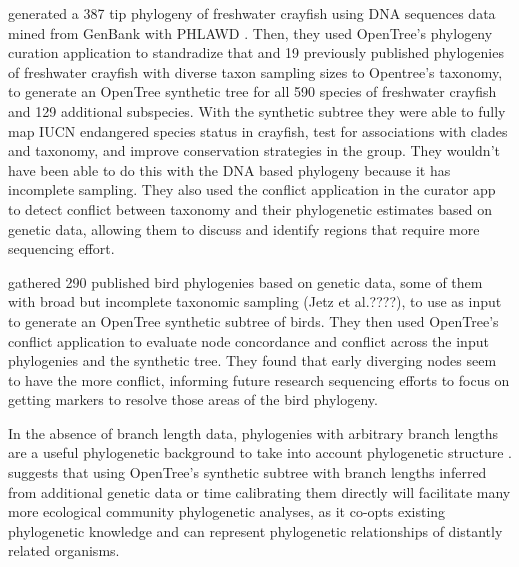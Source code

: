 \documentclass[oupdraft]{sysbio_sse}
\begin{document}
\citep{owen2015synthetic} generated a 387 tip phylogeny of freshwater crayfish using DNA sequences
data mined from GenBank with PHLAWD \citep{smith2009mega}. Then, they used OpenTree's phylogeny
curation application to standradize that and 19 previously published phylogenies of freshwater crayfish
with diverse taxon sampling sizes to Opentree's taxonomy, to generate an OpenTree synthetic tree for all 590 species
of freshwater crayfish and 129 additional subspecies.
With the synthetic subtree they were able to fully map IUCN endangered species
status in crayfish, test for associations with clades and taxonomy, and improve conservation
strategies in the group. They wouldn't have been able to do this with the DNA based phylogeny
because it has incomplete sampling.
They also used the conflict application in the curator app to detect conflict between
taxonomy and their phylogenetic estimates based on genetic data, allowing them to
discuss and identify regions that require more sequencing effort.

\citep{brown2017development} gathered 290 published bird phylogenies based on genetic
data, some of them with broad but incomplete taxonomic sampling (Jetz et al.????),
to use as input to generate an OpenTree synthetic subtree of birds.
They then used OpenTree's conflict application to evaluate node concordance and
conflict across the input phylogenies and the synthetic tree. They found that early diverging nodes
 seem to have the more conflict, informing future research sequencing efforts to
 focus on getting markers to resolve those areas of the bird phylogeny.


In the absence of branch length data, phylogenies with arbitrary branch lengths
are a useful phylogenetic background to take into account phylogenetic structure
\citep{garland1992procedures}.
\citep{jantzen2019effects} suggests that using OpenTree's synthetic subtree with
branch lengths inferred from additional genetic data or time calibrating them directly
will facilitate many more ecological community phylogenetic analyses, as it co-opts existing
phylogenetic knowledge and can represent phylogenetic relationships of distantly related organisms.
\end{document}
